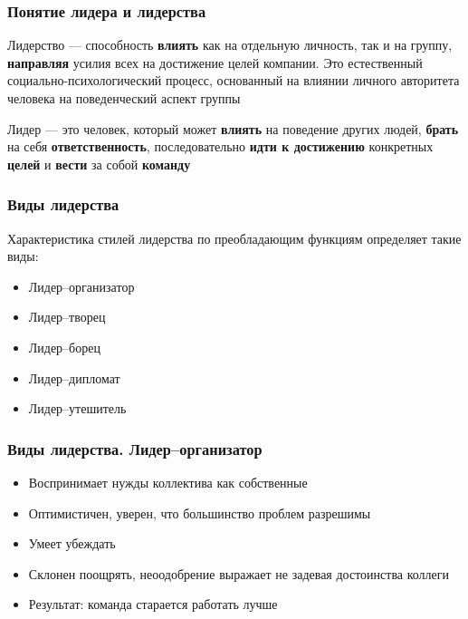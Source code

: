\documentclass{../industrial-development}
\begin{document}
\begin{frame} \frametitle {Понятие лидера и лидерства}

\begin{block}{}
Лидерство --- способность \textbf{влиять} как на отдельную личность, так и на группу, \textbf{направляя} усилия всех на достижение целей компании. Это естественный социально-психологический процесс, основанный на влиянии личного авторитета человека на поведенческий аспект группы
\end{block}


\begin{block}{}
Лидер --- это человек, который может \textbf{влиять} на поведение других людей, \textbf{брать} на себя \textbf{ответственность}, последовательно \textbf{идти к достижению} конкретных \textbf{целей} и \textbf{вести} за собой \textbf{команду}
\end{block}

\end{frame}


\begin{frame} \frametitle{Виды лидерства}
Характеристика стилей лидерства по преобладающим функциям определяет такие виды: 
  \begin{itemize}
  \item Лидер--организатор 
  \item Лидер--творец
  \item Лидер--борец  
  \item Лидер--дипломат
  \item Лидер--утешитель
  \end{itemize}
\end{frame}

\begin{frame} \frametitle{Виды лидерства. Лидер--организатор}

\begin{itemize}
  \item Воспринимает нужды коллектива как собственные 
  \item Оптимистичен, уверен, что большинство проблем разрешимы
  \item Умеет убеждать  
  \item Склонен поощрять, неоодобрение выражает не задевая достоинства коллеги
  \item Результат: команда старается работать лучше
  \end{itemize}

\end{frame}
\end{document}
